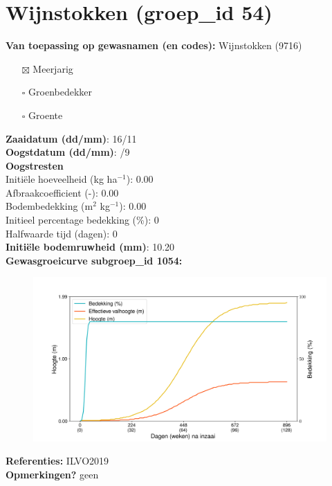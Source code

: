 \documentclass{article}
\begin{document}
 \section{Wijnstokken (groep\_id 54)} 
 \textbf{Van toepassing op gewasnamen (en codes):} Wijnstokken (9716) 
 \begin{multicols}{3} \begin{itemize} \item[$\boxtimes$] Meerjarig \item[$\square$] Groenbedekker \item[$\square$] Groente \end{itemize} \end{multicols} 
  \textbf{Zaaidatum (dd/mm)}: 16/11  \vspace{0.10cm} \\ 
  \textbf{Oogstdatum (dd/mm)}: /9  \vspace{0.10cm} \\ 
  \textbf{Oogstresten} \vspace{0.05cm} \\ 
  \tab Initi\"{e}le hoeveelheid (kg ha$^{-1}$): 0.00 \vspace{0.05cm} \\ 
  \tab Afbraakcoefficient (-): 0.00 \vspace{0.05cm} \\ 
  \tab Bodembedekking (m$^2$ kg$^{-1}$): 0.00 \vspace{0.05cm} \\ 
  \tab Initieel percentage bedekking (\%): 0 \vspace{0.05cm} \\ 
  \tab Halfwaarde tijd (dagen): 0 \vspace{0.05cm} \\ 
  \textbf{Initi\"{e}le bodemruwheid (mm)}: 10.20 \vspace{0.05cm} \\ 
  \textbf{Gewasgroeicurve subgroep\_id 1054:} 
 \begin{center} \begin{figure}[H] \includegraphics[width=12.5cm]{temp/1054.png} \end{figure} \end{center} 
  \textbf{Referenties:} ILVO2019 \vspace{0.10cm} \\ 
  \textbf{Opmerkingen?} geen \vspace{0.10cm} \\ 
 \newpage 
\end{document}
